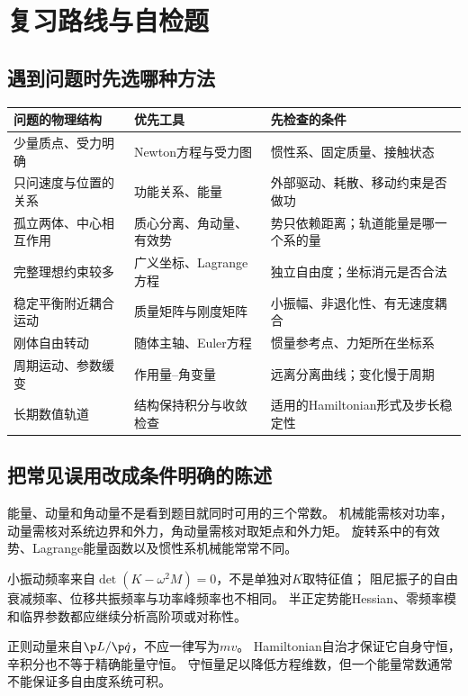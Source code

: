 \chapter{复习路线与自检题}

\section{遇到问题时先选哪种方法}
\begin{center}
\small
\begin{tabular}{p{}p{}p{}}
\hline
问题的物理结构 & 优先工具 & 先检查的条件\\
\hline
少量质点、受力明确 & Newton方程与受力图 & 惯性系、固定质量、接触状态\\
只问速度与位置的关系 & 功能关系、能量 & 外部驱动、耗散、移动约束是否做功\\
孤立两体、中心相互作用 & 质心分离、角动量、有效势 & 势只依赖距离；轨道能量是哪一个系的量\\
完整理想约束较多 & 广义坐标、Lagrange方程 & 独立自由度；坐标消元是否合法\\
稳定平衡附近耦合运动 & 质量矩阵与刚度矩阵 & 小振幅、非退化性、有无速度耦合\\
刚体自由转动 & 随体主轴、Euler方程 & 惯量参考点、力矩所在坐标系\\
周期运动、参数缓变 & 作用量--角变量 & 远离分离曲线；变化慢于周期\\
长期数值轨道 & 结构保持积分与收敛检查 & 适用的Hamiltonian形式及步长稳定性\\
\hline
\end{tabular}
\end{center}

\section{把常见误用改成条件明确的陈述}
能量、动量和角动量不是看到题目就同时可用的三个常数。
机械能需核对功率，动量需核对系统边界和外力，角动量需核对取矩点和外力矩。
旋转系中的有效势、Lagrange能量函数以及惯性系机械能常常不同。

小振动频率来自$\det(K-\omega^2M)=0$，不是单独对$K$取特征值；
阻尼振子的自由衰减频率、位移共振频率与功率峰频率也不相同。
半正定势能Hessian、零频率模和临界参数都应继续分析高阶项或对称性。

正则动量来自$\p L/\p\dot q$，不应一律写为$mv$。
Hamiltonian自治才保证它自身守恒，辛积分也不等于精确能量守恒。
守恒量足以降低方程维数，但一个能量常数通常不能保证多自由度系统可积。

